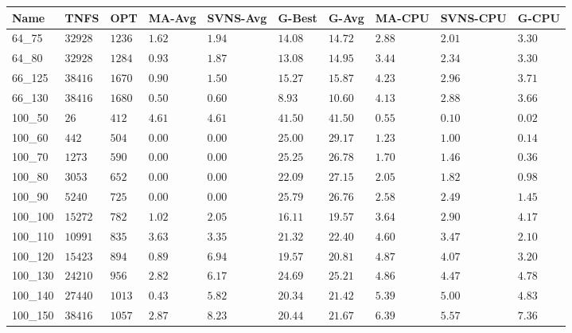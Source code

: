 \begin{center}
    \begin{table}[]
    \centering
    \begin{adjustwidth}{-0.4in}{-1in}
    \begin{tabular}{|lll|l|l|ll|lll|}
\hline
Name     & TNFS        & OPT    & MA-Avg & SVNS-Avg & G-Best & G-Avg & MA-CPU & SVNS-CPU & G-CPU \\
\hline
64\_75   & $32928   $  & $1236$ & $1.62$ & $1.94$   & $14.08$    & $14.72$   & $2.88 $& $2.01$   & $3.30$ \\
64\_80   & $32928   $  & $1284$ & $0.93$ & $1.87$   & $13.08$    & $14.95$   & $3.44 $& $2.34$   & $3.30$ \\
\hline
66\_125  & $38416   $  & $1670$ & $0.90$ & $1.50$   & $15.27$    & $15.87$   & $4.23 $& $2.96$   & $3.71$ \\
66\_130  & $38416   $  & $1680$ & $0.50$ & $0.60$   & $8.93$    & $10.60$   & $4.13 $& $2.88$   & $3.66$ \\
\hline
100\_50  & $26      $  & $412 $ & $4.61$ & $4.61$   & $41.50$    & $41.50$   & $0.55 $& $0.10$   & $0.02$ \\
100\_60  & $442     $  & $504 $ & $\bm{0.00}$ & $\bm{0.00}$   & $25.00$    & $29.17$   & $1.23 $& $1.00$   & $0.14$ \\
100\_70  & $1273    $  & $590 $ & $\bm{0.00}$ & $\bm{0.00}$   & $25.25$    & $26.78$   & $1.70 $& $1.46$   & $0.36$ \\
100\_80  & $3053    $  & $652 $ & $\bm{0.00}$ & $\bm{0.00}$   & $22.09$    & $27.15$   & $2.05 $& $1.82$   & $0.98$ \\
100\_90  & $5240    $  & $725 $ & $\bm{0.00}$ & $\bm{0.00}$   & $25.79$    & $26.76$   & $2.58 $& $2.49$   & $1.45$ \\
100\_100 & $15272   $  & $782 $ & $1.02$ & $2.05$   & $16.11$    & $19.57$   & $3.64 $& $2.90$   & $4.17$ \\
100\_110 & $10991   $  & $835 $ & $3.63$ & $3.35$   & $21.32$    & $22.40$   & $4.60 $& $3.47$   & $2.10$ \\
100\_120 & $15423   $  & $894 $ & $0.89$ & $6.94$   & $19.57$    & $20.81$   & $4.87 $& $4.07$   & $3.20$ \\
100\_130 & $24210   $  & $956 $ & $2.82$ & $6.17$   & $24.69$    & $25.21$   & $4.86 $& $4.47$   & $4.78$ \\
100\_140 & $27440   $  & $1013$ & $0.43$ & $5.82$   & $20.34$    & $21.42$   & $5.39 $& $5.00$   & $4.83$ \\
100\_150 & $38416   $  & $1057$ & $2.87$ & $8.23$   & $20.44$    & $21.67$   & $6.39 $& $5.57$   & $7.36$ \\

\end{tabular}
\end{adjustwidth}
\end{table}
\end{center}
